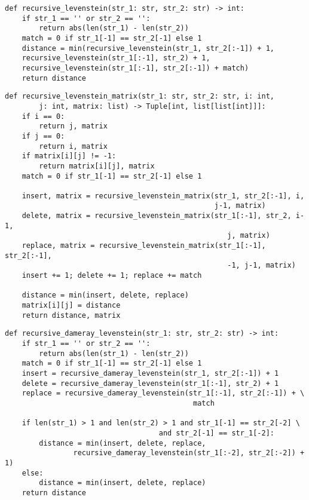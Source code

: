 \begin{lstlisting}[label=some-code,caption=Программный код нахождения расстояния Левенштейна рекурсивно без использования кэша]
def recursive_levenstein(str_1: str, str_2: str) -> int:
	if str_1 == '' or str_2 == '':
		return abs(len(str_1) - len(str_2))
	match = 0 if str_1[-1] == str_2[-1] else 1
	distance = min(recursive_levenstein(str_1, str_2[:-1]) + 1,
	recursive_levenstein(str_1[:-1], str_2) + 1,
	recursive_levenstein(str_1[:-1], str_2[:-1]) + match)
	return distance
\end{lstlisting}

\newpage
\begin{lstlisting}[label=some-code,caption=Программный код нахождения расстояния Левенштейна рекурсивно с использованием матрицы]
	def recursive_levenstein_matrix(str_1: str, str_2: str, i: int, 
		j: int, matrix: list) -> Tuple[int, list[list[int]]]:
	if i == 0:
		return j, matrix
	if j == 0:
		return i, matrix
	if matrix[i][j] != -1:
		return matrix[i][j], matrix
	match = 0 if str_1[-1] == str_2[-1] else 1
	
	insert, matrix = recursive_levenstein_matrix(str_1, str_2[:-1], i,
												 j-1, matrix)
	delete, matrix = recursive_levenstein_matrix(str_1[:-1], str_2, i-1,
											    	j, matrix)
	replace, matrix = recursive_levenstein_matrix(str_1[:-1], str_2[:-1],
													-1, j-1, matrix)
	insert += 1; delete += 1; replace += match
	
	distance = min(insert, delete, replace)
	matrix[i][j] = distance
	return distance, matrix
\end{lstlisting}

\begin{lstlisting}[label=some-code,caption=Программный код нахождения расстояния Дамерау-Левенштейна рекурсивно]
def recursive_dameray_levenstein(str_1: str, str_2: str) -> int:
	if str_1 == '' or str_2 == '':
		return abs(len(str_1) - len(str_2))
	match = 0 if str_1[-1] == str_2[-1] else 1
	insert = recursive_dameray_levenstein(str_1, str_2[:-1]) + 1
	delete = recursive_dameray_levenstein(str_1[:-1], str_2) + 1
	replace = recursive_dameray_levenstein(str_1[:-1], str_2[:-1]) + \
											match
	
	if len(str_1) > 1 and len(str_2) > 1 and str_1[-1] == str_2[-2] \
									and str_2[-1] == str_1[-2]:
		distance = min(insert, delete, replace,
				recursive_dameray_levenstein(str_1[:-2], str_2[:-2]) + 1)
	else:
		distance = min(insert, delete, replace)
	return distance
\end{lstlisting}

